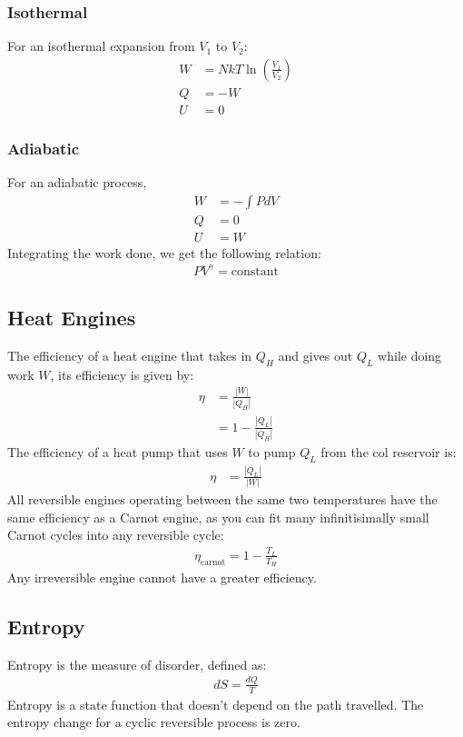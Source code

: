 \documentclass[11pt]{article}
\begin{document}
\begin{multicols*}{3}
\subsubsection{Isothermal}
For an isothermal expansion from $V_1$ to $V_2$:
\begin{align*}
  W &= NkT \ln \left( \frac{V_1}{V_2} \right) \\
  Q &= - W \\
  U &= 0 
\end{align*}

\subsubsection{Adiabatic}
For an adiabatic process,
\begin{align*}
  W &= - \int P dV \\
  Q &= 0 \\
  U &= W
\end{align*}
Integrating the work done, we get the following relation:
\begin{align*}
  PV^{\gamma} = \text{constant}
\end{align*}

\subsection{Heat Engines}
The efficiency of a heat engine that takes in $Q_H$ and gives out $Q_L$ while doing work $W$, its efficiency is given by:
\begin{align*}
  \eta &= \frac{|W|}{|Q_H|} \\
  &= 1 - \frac{|Q_L|}{|Q_H|}
\end{align*}
The efficiency of a heat pump that uses $W$ to pump $Q_L$ from the col reservoir is:
\begin{align*}
  \eta &= \frac{|Q_L|}{|W|}
\end{align*}
All reversible engines operating between the same two temperatures have the same efficiency as a Carnot engine, as you can fit many infinitisimally small Carnot cycles into any reversible cycle:
\begin{align*}
  \eta_{\text{carnot}} = 1 - \frac{T_L}{T_H}
\end{align*}
Any irreversible engine cannot have a greater efficiency.

\subsection{Entropy}
Entropy is the measure of disorder, defined as:
\begin{align*}
  dS = \frac{dQ}{T}
\end{align*}
Entropy is a state function that doesn't depend on the path travelled. The entropy change for a cyclic reversible process is zero.


\end{multicols*}
\end{document}
